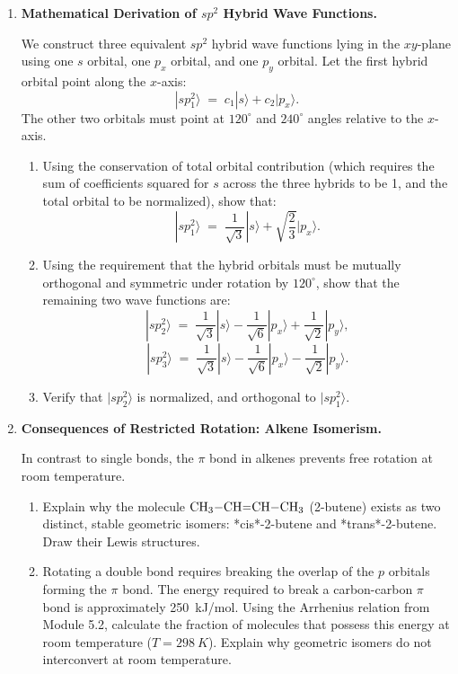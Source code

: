 \documentclass[12pt, a4paper]{book}
\begin{document}
\begin{deepbox}
\begin{enumerate}[label=\textbf{D\arabic*.}]
  \item \textbf{Mathematical Derivation of $sp^2$ Hybrid Wave Functions.}
  
        We construct three equivalent $sp^2$ hybrid wave functions lying in the $xy$-plane using one $s$ orbital, one $p_x$ orbital, and one $p_y$ orbital.
        Let the first hybrid orbital point along the $x$-axis:
        \[
          |sp^2_1\rangle \;=\; c_1 |s\rangle + c_2 |p_x\rangle.
        \]
        The other two orbitals must point at $120^\circ$ and $240^\circ$ angles relative to the $x$-axis.
        \begin{enumerate}[label=(\alph*)]
          \item Using the conservation of total orbital contribution (which requires the sum of coefficients squared for $s$ across the three hybrids to be 1, and the total orbital to be normalized), show that:
          \[
            |sp^2_1\rangle \;=\; \frac{1}{\sqrt{3}} |s\rangle + \sqrt{\frac{2}{3}} |p_x\rangle.
          \]
          \item Using the requirement that the hybrid orbitals must be mutually orthogonal and symmetric under rotation by $120^\circ$, show that the remaining two wave functions are:
          \[
            |sp^2_2\rangle \;=\; \frac{1}{\sqrt{3}} |s\rangle - \frac{1}{\sqrt{6}} |p_x\rangle + \frac{1}{\sqrt{2}} |p_y\rangle,
          \]
          \[
            |sp^2_3\rangle \;=\; \frac{1}{\sqrt{3}} |s\rangle - \frac{1}{\sqrt{6}} |p_x\rangle - \frac{1}{\sqrt{2}} |p_y\rangle.
          \]
          \item Verify that $|sp^2_2\rangle$ is normalized, and orthogonal to $|sp^2_1\rangle$.
        \end{enumerate}

  \item \textbf{Consequences of Restricted Rotation: Alkene Isomerism.}
  
        In contrast to single bonds, the $\pi$ bond in alkenes prevents free rotation at room temperature.
        \begin{enumerate}[label=(\alph*)]
          \item Explain why the molecule $\ce{CH3-CH=CH-CH3}$ (2-butene) exists as two distinct, stable geometric isomers: *cis*-2-butene and *trans*-2-butene. Draw their Lewis structures.
          \item Rotating a double bond requires breaking the overlap of the $p$ orbitals forming the $\pi$ bond. The energy required to break a carbon-carbon $\pi$ bond is approximately \SI{250}{kJ/mol}.
                Using the Arrhenius relation from Module 5.2, calculate the fraction of molecules that possess this energy at room temperature ($T = \SI{298}{K}$). Explain why geometric isomers do not interconvert at room temperature.
        \end{enumerate}
\end{enumerate}
\end{deepbox}
\end{document}
